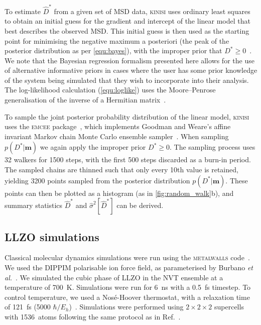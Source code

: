 \documentclass[reprint,superscriptaddress,nobibnotes,amsmath,amssymb,aps,prx,hidelinks]{revtex4-2}
\newcommand{\model}{\bm{m}}
\newcommand{\prob}[1]{\ensuremath{p(#1)}}
\newcommand{\Dest}{\ensuremath{\widehat{D}^*}}
\newcommand{\D}{\ensuremath{D^*}}
\newcommand{\varest}[1]{\ensuremath{\widehat{\sigma}^2[#1]}}
\begin{document}
To estimate $\Dest$ from a given set of MSD data, \textsc{kinisi} uses ordinary least squares to obtain an initial guess for the gradient and intercept of the linear model that best describes the observed MSD.
This initial guess is then used as the starting point for minimising the negative maximum a posteriori (the peak of the posterior distribution as per \cref{equ:bayes}), with the improper prior that $\D \ge 0$~\cite{broyden_convergence_1970,fletcher_new_1970,goldfarb_family_1970,shanno_conditioning_1970}.
We note that the Bayesian regression formalism presented here allows for the use of alternative informative priors in cases where the user has some prior knowledge of the system being simulated that they wish to incorporate into their analysis.
The log-likelihood calculation (\cref{equ:loglike}) uses the Moore--Penrose generalisation of the inverse of a Hermitian matrix~\cite{moore_on_1920,bjerhammar_application_1951,penrose_generlized_1955}.


To sample the joint posterior probability distribution of the linear model, \textsc{kinisi} uses the \textsc{emcee} package~\cite{foremanmackey_emcee_2019}, which implements Goodman and Weare's affine invariant Markov chain Monte Carlo ensemble sampler~\cite{goodman_ensemble_2010}. 
When sampling $\prob{\D|\model}$ we again apply the improper prior $\D \ge 0$.
The sampling process uses \num{32} walkers for \num{1500} steps, with the first \num{500} steps discarded as a burn-in period.
The sampled chains are thinned such that only every 10th value is retained, yielding \num{3200} points sampled from the posterior distribution $\prob{\D|\model}$.
These points can then be plotted as a histogram (as in \cref{fig:random_walk}b), and summary statistics $\Dest$ and $\varest{\Dest}$ can be derived.

\subsection{LLZO simulations}
Classical molecular dynamics simulations were run using the \textsc{metalwalls} code~\cite{marin_metalwalls_2020}. 
We used the DIPPIM polarisable ion force field, as parameterised by Burbano \emph{et al.}~\cite{burbano_sparse_2016}. 
We simulated the cubic phase of LLZO in the NVT ensemble at a temperature of \SI{700}{\kelvin}.
Simulations were run for \SI{6}{\nano\second} with a \SI{0.5}{\femto\second} timestep. 
To control temperature, we used a Nos\'{e}-Hoover thermostat, with a relaxation time of \SI{121}{\femto\second} (5000 $\hbar / E_{h}$)~\cite{nose_unified_1984,hoover_canonical_1985,martyna_nose_1992}. 
Simulations were performed using $2 \times 2 \times 2$ supercells with \SI{1536}{atoms} following the same protocol as in Ref.~.
\end{document}
